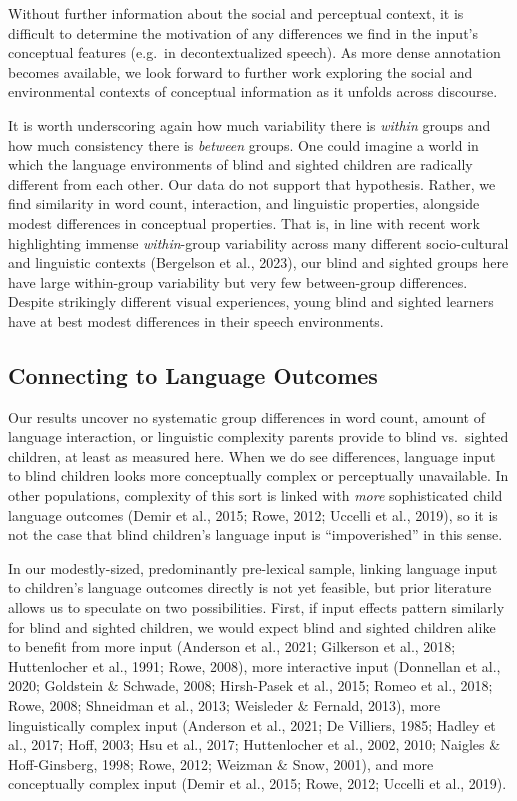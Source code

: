 \documentclass[
  man,floatsintext]{apa6}
\begin{document}
Without further information about the social and perceptual context, it is difficult to determine the motivation of any differences we find in the input's conceptual features (e.g.~in decontextualized speech). As more dense annotation becomes available, we look forward to further work exploring the social and environmental contexts of conceptual information as it unfolds across discourse.

It is worth underscoring again how much variability there is \emph{within} groups and how much consistency there is \emph{between} groups. One could imagine a world in which the language environments of blind and sighted children are radically different from each other. Our data do not support that hypothesis. Rather, we find similarity in word count, interaction, and linguistic properties, alongside modest differences in conceptual properties. That is, in line with recent work highlighting immense \emph{within}-group variability across many different socio-cultural and linguistic contexts (Bergelson et al., 2023), our blind and sighted groups here have large within-group variability but very few between-group differences. Despite strikingly different visual experiences, young blind and sighted learners have at best modest differences in their speech environments.

\hypertarget{connecting-to-language-outcomes}{%
\subsection{Connecting to Language Outcomes}\label{connecting-to-language-outcomes}}

Our results uncover no systematic group differences in word count, amount of language interaction, or linguistic complexity parents provide to blind vs.~sighted children, at least as measured here. When we do see differences, language input to blind children looks more conceptually complex or perceptually unavailable. In other populations, complexity of this sort is linked with \emph{more} sophisticated child language outcomes (Demir et al., 2015; Rowe, 2012; Uccelli et al., 2019), so it is not the case that blind children's language input is ``impoverished'' in this sense.

In our modestly-sized, predominantly pre-lexical sample, linking language input to children's language outcomes directly is not yet feasible, but prior literature allows us to speculate on two possibilities. First, if input effects pattern similarly for blind and sighted children, we would expect blind and sighted children alike to benefit from more input (Anderson et al., 2021; Gilkerson et al., 2018; Huttenlocher et al., 1991; Rowe, 2008), more interactive input (Donnellan et al., 2020; Goldstein \& Schwade, 2008; Hirsh-Pasek et al., 2015; Romeo et al., 2018; Rowe, 2008; Shneidman et al., 2013; Weisleder \& Fernald, 2013), more linguistically complex input (Anderson et al., 2021; De Villiers, 1985; Hadley et al., 2017; Hoff, 2003; Hsu et al., 2017; Huttenlocher et al., 2002, 2010; Naigles \& Hoff-Ginsberg, 1998; Rowe, 2012; Weizman \& Snow, 2001), and more conceptually complex input (Demir et al., 2015; Rowe, 2012; Uccelli et al., 2019).
\end{document}
